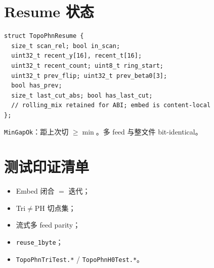 \section{Resume 状态}

\begin{lstlisting}[caption={TopoPhnResume},label={lst:phn-resume}]
struct TopoPhnResume {
  size_t scan_rel; bool in_scan;
  uint32_t recent_y[16], recent_t[16];
  uint32_t recent_count; uint8_t ring_start;
  uint32_t prev_flip; uint32_t prev_beta0[3];
  bool has_prev;
  size_t last_cut_abs; bool has_last_cut;
  // rolling_mix retained for ABI; embed is content-local
};
\end{lstlisting}

\texttt{MinGapOk}：距上次切 $\ge\min$。多 feed 与整文件 bit-identical。

\section{测试印证清单}

\begin{itemize}[nosep]
  \item Embed 闭合 $=$ 迭代；
  \item Tri$\neq$PH 切点集；
  \item 流式多 feed parity；
  \item \texttt{reuse\_1byte}；
  \item \texttt{TopoPhnTriTest.*} / \texttt{TopoPhnH0Test.*}。
\end{itemize}

